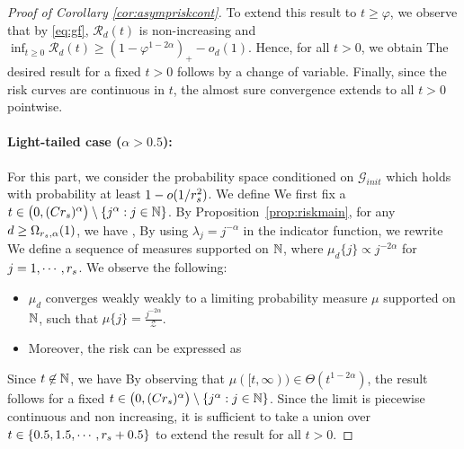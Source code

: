 \begin{proof}[Proof of   Corollary \ref{cor:asympriskcont}]
To extend this result to $t \geq   \varphi$, we observe that by \eqref{eq:gf},   $\mathcal{R}_d(t )$  is non-increasing and  $\inf_{t \geq 0} \mathcal{R}_d(t )  \geq (1 - \varphi^{1 - 2\alpha})_{+} - o_d(1)$. Hence,    for all $t > 0$, we obtain
The desired result for a fixed 
$t > 0$ follows by a change of variable. Finally, since the risk curves are continuous in $t$, the almost sure convergence extends to all $t > 0$   pointwise.

\paragraph{Light-tailed case ($\alpha > 0.5$):}  For this part, we consider the probability space conditioned on $\mathcal{G}_{init}$ which holds with probability at least $1 - o(1/r_s^2)$.  We define 
 We first fix a $t \in \big( 0, (C r_s)^{\alpha} \big)  \setminus \{ j^{\alpha} : j \in \mathbb{N}\}$. 
By Proposition~\ref{prop:riskmain}, for any  $d \geq \Omega_{r_s, \alpha}(1)$, we have ,
By using $\lambda_j = j^{-\alpha}$ in the indicator function, we   rewrite
We define a sequence of measures supported on $\mathbb{N}$, where $\mu_d\{j \} \propto j^{-2\alpha}$ for $j = 1, \cdots, r_s$. We observe the following:
\begin{itemize}
    \item $\mu_d$ converges weakly weakly to a limiting probability measure $\mu$   supported on  $\mathbb{N}$, such that $\mu\{ j\} = \frac{j^{-2\alpha}}{\mathcal{Z}}$.
    \item Moreover, the risk can be expressed as
\end{itemize}
Since $t \not \in \mathbb{N}$, we have
\eq{
\R_d(t) \to  \mu([t \vee \rs, \infty)).
}
By observing that  $\mu([t, \infty)) \in \Theta(t^{1 - 2\alpha})$, the result follows for a fixed $t \in \big( 0, (C r_s)^{\alpha} \big)  \setminus \{ j^{\alpha} : j \in \mathbb{N}\}$. Since the limit is piecewise continuous and non increasing, it is sufficient to take a union over $t \in \{ 0.5, 1.5, \cdots, r_s + 0.5 \}$ to extend the result for all $t > 0$.
\end{proof}


